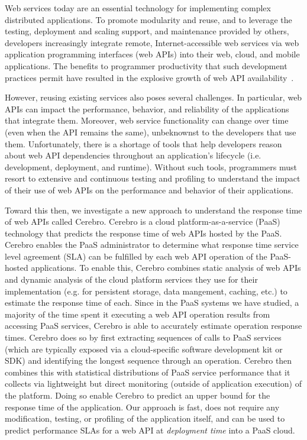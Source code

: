 Web services today are an essential technology for implementing
complex distributed applications.  To promote modularity and reuse, 
and to leverage the testing, deployment and scaling support, and maintenance 
provided by others, developers increasingly integrate remote, Internet-accessible web services 
via web application programming interfaces (web APIs)
into their web, cloud, and mobile applications.  
The benefits to programmer productivity that such development practices
permit have resulted in the explosive growth of web API availability~\cite{pweb}.

However, reusing existing services also poses several challenges. In particular, 
web APIs can impact the performance, behavior, and reliability of the applications
that integrate them.  Moreover, web service functionality can change over time 
(even when the API remains the same), unbeknownst to the developers that use them.
Unfortunately, there is a shortage of tools that help developers 
reason about web API dependencies throughout an application's 
lifecycle (i.e. development, deployment, and runtime).  Without such tools, 
programmers must resort to extensive and continuous testing and profiling 
to understand the impact of their use of web APIs on the performance and behavior
of their applications.

Toward this then, we investigate a new approach to understand the response time 
of web APIs called Cerebro.  Cerebro is a cloud platform-as-a-service (PaaS) technology that
predicts the response time of web APIs hosted by the PaaS.
Cerebro enables the PaaS administrator to determine what response time service level 
agreement (SLA) can be fulfilled by each web API operation of the 
PaaS-hosted applications.
To enable this, Cerebro combines static analysis of web APIs and dynamic analysis
of the cloud platform services they use for their implementation 
(e.g. for persistent storage, data mangement, caching, etc.) to estimate
the response time of each.  Since in the PaaS systems we have studied, a majority 
of the time spent it executing a web API operation results from accessing 
PaaS services, Cerebro is able to accurately estimate operation response times.
Cerebro does so by first extracting sequences of calls to PaaS services (which are
typically exposed via a cloud-specific software development kit or SDK) and identifying
the longest sequence through an operation.  Cerebro then combines this with statistical
distributions of PaaS service performance that it collects via lightweight but direct
monitoring (outside of application execution) of the platform.
Doing so enable Cerebro to predict an upper bound for the response
time of the application. Our approach is fast, does not require any modification,
testing, or profiling of the application itself, 
and can be used to predict performance SLAs for a web API at \textit{deployment time}
into a PaaS cloud.

